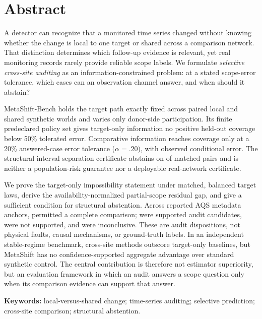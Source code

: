 \begin{center}
{\LARGE\bfseries \ReportTitle\par}
\vspace{0.8em}
{\large \StudentAuthors\par}
\vspace{0.4em}
{\small \SchoolAffiliation\par}
\vspace{0.4em}
{\small \SupervisingTeachers\par}
\end{center}

\section*{Abstract}
\noindent A detector can recognize that a monitored time series changed without
knowing whether the change is local to one target or shared across a comparison
network. That distinction determines which follow-up evidence is relevant, yet
real monitoring records rarely provide reliable scope labels. We formulate
\emph{selective cross-site auditing} as an information-constrained problem: at
a stated scope-error tolerance, which cases can an observation channel answer,
and when should it abstain?

\noindent MetaShift-Bench holds the target path exactly fixed across paired
local and shared synthetic worlds and varies only donor-side participation. Its
finite predeclared policy set gives target-only information no positive
held-out coverage below 50\% tolerated error. Comparative information reaches
\VFiveComparativeFrontierTwentyPercent{} coverage only at a 20\% answered-case
error tolerance ($\alpha=.20$), with \VFiveComparativeRiskTwentyPercent{}
observed conditional error. The structural interval-separation certificate
abstains on \VFiveCertificateAbstentionPercent{} of matched pairs and is neither
a population-risk guarantee nor a deployable real-network certificate.

\noindent We prove the target-only impossibility statement under matched,
balanced target laws, derive the availability-normalized partial-scope residual
gap, and give a sufficient condition for structural abstention. Across
\TotalAnchors{} reported AQS metadata anchors, \CompleteComparisons{} permitted
a complete comparison; \SupportedCandidates{} were supported audit candidates,
\NotSupportedEvents{} were not supported, and \InconclusiveEvents{} were
inconclusive. These are audit dispositions, not physical faults, causal
mechanisms, or ground-truth labels. In an independent stable-regime benchmark,
cross-site methods outscore target-only baselines, but MetaShift has no
confidence-supported aggregate advantage over standard synthetic control. The
central contribution is therefore not estimator superiority, but an evaluation
framework in which an audit answers a scope question only when its comparison
evidence can support that answer.

\noindent\textbf{Keywords:} local-versus-shared change; time-series auditing;
selective prediction; cross-site comparison; structural abstention.
